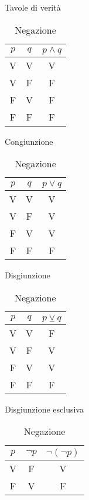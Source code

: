 \begin{table}[hbtp]
\caption{Tavole di verità}\label{tab:cong}
\centering%
\begin{minipage}[b]{0.22\linewidth}
\centering%
 \begin{tabular}{ccc} %
 \toprule
$p$ &$q$ &$p\wedge q$\\
\midrule
V & V & V \\
V & F & F \\
F & V & F \\
F & F & F \\
\bottomrule
 \end{tabular}
\caption*{Congiunzione}
\end{minipage}
\begin{minipage}[b]{0.22\linewidth}
\centering%
 \begin{tabular}{ccc} %
 \toprule
$p$ &$q$ &$p\vee q$\\
\midrule
V & V & V \\
V & F & V \\
F & V & V \\
F & F & F \\
\bottomrule
 \end{tabular}
\caption*{Disgiunzione}
\end{minipage}
\begin{minipage}[b]{0.28\linewidth}
\centering%
 \begin{tabular}{ccc} %
 \toprule
$p$ &$q$ &$p\veebar q$\\
\midrule
V & V & F \\
V & F & V \\
F & V & V \\
F & F & F \\
\bottomrule
 \end{tabular}
\caption*{Disgiunzione esclusiva}
\end{minipage}
\begin{minipage}[b]{0.24\linewidth}
\centering%
 \begin{tabular}{ccc} %
 \toprule
$p$ &$\neg p$ &$\neg(\neg p)$\\
\midrule
V & F & V \\
F & V & F \\
\bottomrule
 \end{tabular}
\caption*{Negazione}
\end{minipage}
\end{table}
